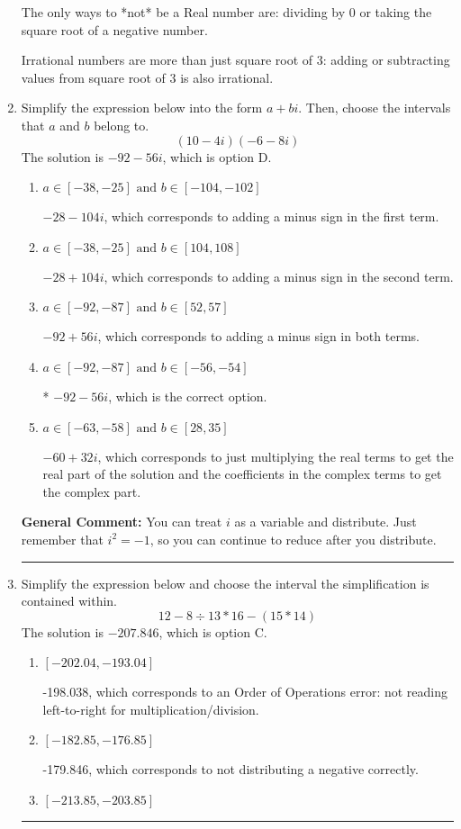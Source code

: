 \documentclass{extbook}[14pt]
\newcommand{\litem}[1]{\item #1

\rule{\textwidth}{0.4pt}}
\begin{document}
\begin{enumerate}
{ The only ways to *not* be a Real number are: dividing by 0 or taking the square root of a negative number. 
 
 Irrational numbers are more than just square root of 3: adding or subtracting values from square root of 3 is also irrational.
}
\litem{
Simplify the expression below into the form $a+bi$. Then, choose the intervals that $a$ and $b$ belong to.
\[ (10 - 4 i)(-6 - 8 i) \]The solution is \( -92 - 56 i \), which is option D.\begin{enumerate}[label=\Alph*.]
\item \( a \in [-38, -25] \text{ and } b \in [-104, -102] \)

 $-28 - 104 i$, which corresponds to adding a minus sign in the first term.
\item \( a \in [-38, -25] \text{ and } b \in [104, 108] \)

 $-28 + 104 i$, which corresponds to adding a minus sign in the second term.
\item \( a \in [-92, -87] \text{ and } b \in [52, 57] \)

 $-92 + 56 i$, which corresponds to adding a minus sign in both terms.
\item \( a \in [-92, -87] \text{ and } b \in [-56, -54] \)

* $-92 - 56 i$, which is the correct option.
\item \( a \in [-63, -58] \text{ and } b \in [28, 35] \)

 $-60 + 32 i$, which corresponds to just multiplying the real terms to get the real part of the solution and the coefficients in the complex terms to get the complex part.
\end{enumerate}

\textbf{General Comment:} You can treat $i$ as a variable and distribute. Just remember that $i^2=-1$, so you can continue to reduce after you distribute.
}
\litem{
Simplify the expression below and choose the interval the simplification is contained within.
\[ 12 - 8 \div 13 * 16 - (15 * 14) \]The solution is \( -207.846 \), which is option C.\begin{enumerate}[label=\Alph*.]
\item \( [-202.04, -193.04] \)

 -198.038, which corresponds to an Order of Operations error: not reading left-to-right for multiplication/division.
\item \( [-182.85, -176.85] \)

 -179.846, which corresponds to not distributing a negative correctly.
\item \( [-213.85, -203.85] \)


\end{enumerate}}
\end{enumerate}
\end{document}
